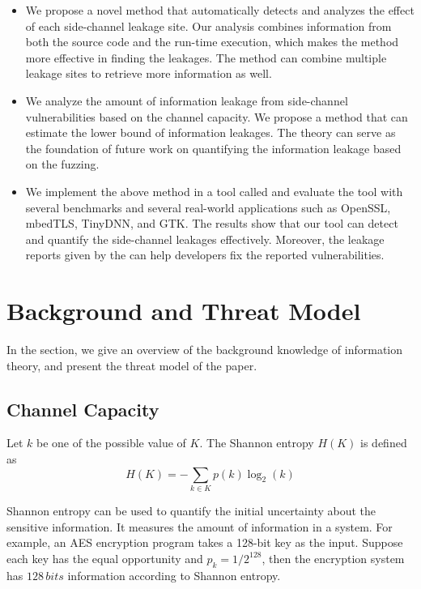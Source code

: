 \begin{itemize}

  \item We propose a novel method that automatically detects and analyzes the effect of each side-channel leakage site. Our analysis combines information from both the source code and the run-time execution, which makes the method more effective in finding the leakages. The method can combine multiple leakage sites to retrieve more information as well.

  \item We analyze the amount of information leakage from side-channel vulnerabilities based on the channel capacity. We propose a method that can estimate the lower bound of information leakages. The theory can serve as the foundation of future work on quantifying the information leakage based on the fuzzing.

  \item We implement the above method in a tool called \ctool{} and evaluate the tool with several benchmarks and several real-world applications such as OpenSSL, mbedTLS, TinyDNN, and GTK. The results show that our tool can detect and quantify the side-channel leakages effectively. Moreover, the leakage reports given by the \ctool{} can help developers fix the reported vulnerabilities.
\end{itemize}

\section{Background and Threat Model}
In the section, we give an overview of the background knowledge of information theory, and present the threat model of the paper.


\subsection{Channel Capacity}
Let $k$ be one of the possible
value of $K$. The Shannon entropy $H(K)$ is defined as
\begin{equation}\label{chapter5:eq1}
  H(K) = - \sum_{k {\in} K}p(k)\log_2(k)
\end{equation}

Shannon entropy can be used to quantify the initial uncertainty about the sensitive information. It measures the amount of information in a system. For example, an AES encryption program takes a 128-bit key as the input. Suppose each key has the equal opportunity and $p_k = 1/ 2^{128}$, then the encryption system has $128 \, \mathit{bits}$ information according to Shannon entropy.


